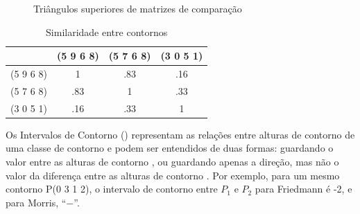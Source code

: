 \begin{figure}
  \qquad
  \qquad
  \caption{Triângulos superiores de matrizes de comparação}
  \label{fig:triangulos-com-matrix}
\end{figure}

\begin{table}
  \centering
    \begin{tabular}{c|ccc}
      & (5 9 6 8) & (5 7 6 8) & (3 0 5 1) \\
      \hline
      (5 9 6 8) & 1 & .83 & .16 \\
      (5 7 6 8) & .83 & 1 & .33 \\
      (3 0 5 1) & .16 & .33 & 1
    \end{tabular}
    \caption{Similaridade entre contornos}
  \label{tab:similaridade-contornos}
\end{table}

Os Intervalos de Contorno () representam as relações entre
alturas de contorno de uma classe de contorno e podem ser entendidos
de duas formas: guardando o valor entre as alturas de contorno
\cite{friedmann85:methodology}, ou guardando apenas a direção, mas não
o valor da diferença entre as alturas de contorno
\cite{morris93:directions}. Por exemplo, para um mesmo contorno P(0 3
1 2), o intervalo de contorno entre $P_1$ e $P_2$ para Friedmann é -2,
e para Morris, ``$-$''.

